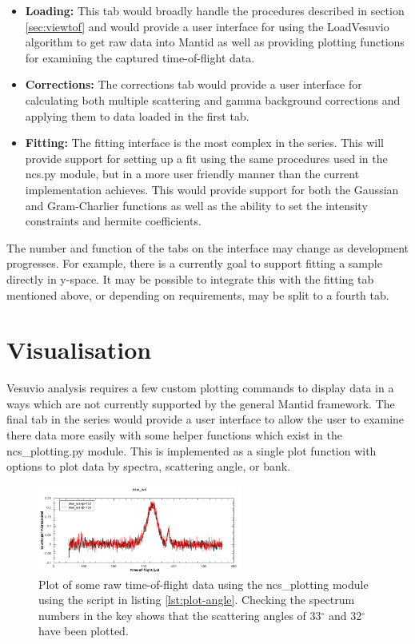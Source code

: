 \documentclass[paper=a4, fontsize=11pt]{scrartcl}	%
\numberwithin{equation}{section}															%
\numberwithin{figure}{section}																%
\numberwithin{table}{section}
\begin{document}
\begin{itemize}
\item \textbf{Loading:} This tab would broadly handle the procedures described in section \ref{sec:viewtof} and would provide a user interface for using the LoadVesuvio algorithm to get raw data into Mantid as well as providing plotting functions for examining the captured time-of-flight data.

\item \textbf{Corrections:} The corrections tab would provide a user interface for calculating both multiple scattering and gamma background corrections and applying them to data loaded in the first tab.

\item \textbf{Fitting:} The fitting interface is the most complex in the series. This will provide support for setting up a fit using the same procedures used in the ncs.py module, but in a more user friendly manner than the current implementation achieves. This would provide support for both the Gaussian and Gram-Charlier functions as well as the ability to set the intensity constraints and hermite coefficients.
\end{itemize}

The number and function of the tabs on the interface may change as development progresses. For example, there is a currently goal to support fitting a sample directly in y-space. It may be possible to integrate this with the fitting tab mentioned above, or depending on requirements, may be split to a fourth tab.

\section{Visualisation}
\label{sec:visualisation}
Vesuvio analysis requires a few custom plotting commands to display data in a ways which are not currently supported by the general Mantid framework. The final tab in the series would provide a user interface to allow the user to examine there data more easily with some helper functions which exist in the ncs\_plotting.py module. This is implemented as a single plot function with options to plot data by spectra, scattering angle, or bank.

\begin{figure}[H]
\centering
\includegraphics[width=0.6\textwidth]{img/plot-angle.png}
\caption{Plot of some raw time-of-flight data using the ncs\_plotting module using the script in listing \ref{lst:plot-angle}. Checking the spectrum numbers in the key shows that the scattering angles of 33$^\circ$ and 32$^\circ$ have been plotted.}
\label{fig:plot-angle}
\end{figure}
\end{document}
